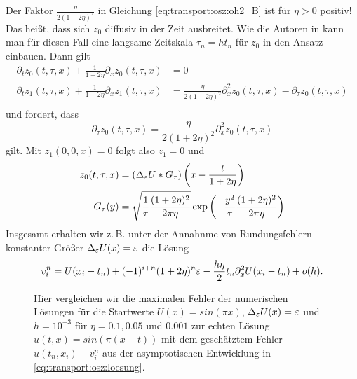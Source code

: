 Der Faktor $\frac{\eta}{2 (1 + 2 \eta)^2}$ in Gleichung \eqref{eq:transport:osz:oh2_B} ist für $\eta > 0$ positiv!
Das heißt, dass sich $z_0$ diffusiv in der Zeit ausbreitet.
Wie die Autoren in \cite{Junk2004} kann man für diesen Fall eine langsame Zeitskala $\tau_n = h t_n$ für $z_0$ in den Ansatz einbauen.
Dann gilt
\begin{align*}
\partial_t z_0(t, \tau, x) + \frac {1} {1 + 2 \eta} \partial_x z_0(t, \tau, x) &= 0\\
\partial_t z_1(t, \tau, x) + \frac {1} {1 + 2 \eta} \partial_x z_1(t, \tau, x) &= \frac{\eta}{2 (1 + 2 \eta)^2} \partial^2_x z_0(t, \tau, x) - \partial_\tau z_0(t, \tau, x)\\
\end{align*}
und fordert, dass
\[ 
\partial_\tau z_0(t, \tau, x) = \frac{\eta}{2 (1 + 2 \eta)^2} \partial^2_x z_0(t, \tau, x) 
\]
gilt. Mit $z_1(0,0,x) = 0$ folgt also $z_1 = 0$ und
\begin{align*}
z_0(t, \tau, x) &= (\Delta_\varepsilon U * G_\tau)\left(x - \frac{t}{1 + 2 \eta} \right) \\
G_\tau(y) &= \sqrt {\frac{1}{\tau} \frac {(1 + 2 \eta)^2}{2 \pi \eta}} \exp\left( - \frac{y^2}{\tau} \frac {(1 + 2 \eta)^2}{2 \pi \eta} \right)
\end{align*}
Insgesamt erhalten wir z.\,B. unter der Annahnme von Rundungsfehlern konstanter Größer $\Delta_\varepsilon U(x) = \varepsilon$ die Lösung
\begin{align}\label{eq:transport:osz:loesung}
v^n_i = U(x_i - t_n) + (-1)^{i+n} (1 + 2 \eta)^n \varepsilon - \frac{h\eta} 2 t_n \partial^2_x U(x_i - t_n) + o(h).
\end{align}
 
\begin{figure}
\centering
{}
\caption{Hier vergleichen wir die maximalen Fehler der numerischen Lösungen für die Startwerte $U(x) = sin(\pi x)$, $\Delta_\varepsilon U(x) = \varepsilon$ und $h = 10^{-3}$ für $\eta = 0.1, 0.05$ und $0.001$ zur echten Lösung $u(t,x) = sin(\pi(x - t))$ mit dem geschätztem Fehler $u(t_n, x_i) - v^n_i$ aus der asymptotischen Entwicklung in \eqref{eq:transport:osz:loesung}.}
\label{fig:transport:osz:max_error}
\end{figure}

